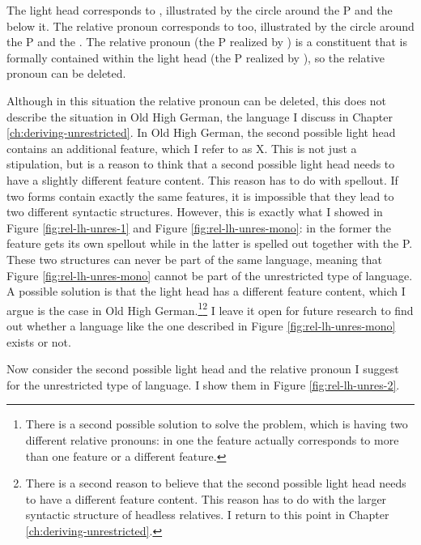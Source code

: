 The light head corresponds to , illustrated by the circle around the P and the  below it. The relative pronoun corresponds to  too, illustrated by the circle around the P and the . The relative pronoun (the P realized by ) is a constituent that is formally contained within the light head (the P realized by ), so the relative pronoun can be deleted.

Although in this situation the relative pronoun can be deleted, this does not describe the situation in Old High German, the language I discuss in Chapter \ref{ch:deriving-unrestricted}. In Old High German, the second possible light head contains an additional feature, which I refer to as X.
This is not just a stipulation, but is a reason to think that a second possible light head needs to have a slightly different feature content. This reason has to do with spellout. If two forms contain exactly the same features, it is impossible that they lead to two different syntactic structures. However, this is exactly what I showed in Figure \ref{fig:rel-lh-unres-1} and Figure \ref{fig:rel-lh-unres-mono}: in the former the feature  gets its own spellout while in the latter  is spelled out together with the P. These two structures can never be part of the same language, meaning that Figure \ref{fig:rel-lh-unres-mono} cannot be part of the unrestricted type of language. A possible solution is that the light head has a different feature content, which I argue is the case in Old High German.\footnote{
There is a second possible solution to solve the problem, which is having two different relative pronouns: in one the feature  actually corresponds to more than one feature or a different feature.
}\footnote{
There is a second reason to believe that the second possible light head needs to have a different feature content. This reason has to do with the larger syntactic structure of headless relatives. I return to this point in Chapter \ref{ch:deriving-unrestricted}.
}
I leave it open for future research to find out whether a language like the one described in Figure \ref{fig:rel-lh-unres-mono} exists or not.

Now consider the second possible light head and the relative pronoun I suggest for the unrestricted type of language. I show them in Figure \ref{fig:rel-lh-unres-2}.

